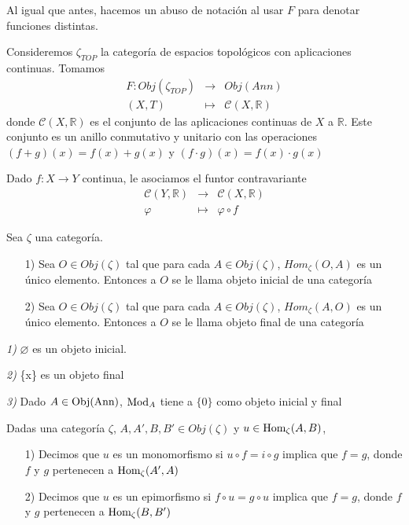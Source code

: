 \documentclass[../main.tex]{subfiles}
\begin{document}
Al igual que antes, hacemos un abuso de notación al usar $F$ para denotar funciones distintas.
\begin{example}
Consideremos $\zeta_{TOP}$ la categoría de espacios topológicos con aplicaciones continuas. Tomamos
$$\begin{array}{rcl}
    F: Obj(\zeta_{TOP})&\longrightarrow&Obj(Ann)\\
    (X,T)&\longmapsto&\mathcal{C}(X,\mathbb{R})
    \end{array}$$
donde $\mathcal{C}(X,\mathbb{R})$ es el conjunto de las aplicaciones continuas de $X$ a $\mathbb{R}$. Este conjunto es un anillo conmutativo y unitario con las operaciones $(f+g)(x)=f(x)+g(x)$ y $(f\cdot g)(x)=f(x)\cdot g(x)$

Dado $f:X\rightarrow Y$ continua, le asociamos el funtor contravariante
$$\begin{array}{rcl}
    \mathcal{C}(Y,\mathbb{R})&\longrightarrow&\mathcal{C}(X,\mathbb{R})\\
    \varphi&\longmapsto&\varphi\circ f
    \end{array}$$
\end{example}
\begin{definition} Sea $\zeta$ una categoría.\begin{itemize}
    \item [1)]Sea $O\in Obj(\zeta)$ tal que para cada $A\in Obj(\zeta)$, $Hom_{\zeta}(O,A)$ es un único elemento. Entonces a $O$ se le llama objeto inicial de una categoría
    \item [2)] Sea $O\in Obj(\zeta)$ tal que para cada $A\in Obj(\zeta)$, $Hom_{\zeta}(A,O)$ es un único elemento. Entonces a $O$ se le llama objeto final de una categoría
\end{itemize}
\end{definition}
\begin{example}
\textit{1)} $\varnothing$ es un objeto inicial.

\textit{2)} \{x\} es un objeto final

\textit{3)} Dado $A\in \text{Obj}(\text{Ann})$, $\text{Mod}_A$ tiene a $\{0\}$ como objeto inicial y final
\end{example}
\begin{definition} Dadas una categoría $\zeta$, $A, A', B, B'\in Obj(\zeta)$ y $u\in \text{Hom}_{\zeta}(A,B)$, \begin{itemize}
    \item [1)] Decimos que $u$ es un monomorfismo si $u\circ f=i\circ g$ implica que $f=g$, donde $f$ y $g$ pertenecen a $\text{Hom}_{\zeta}(A',A)$
    \item[2)] Decimos que $u$ es un epimorfismo si $f\circ u=g\circ u$ implica que $f=g$, donde $f$ y $g$ pertenecen a $\text{Hom}_{\zeta}(B,B')$
\end{itemize}
\end{definition}
\end{document}
